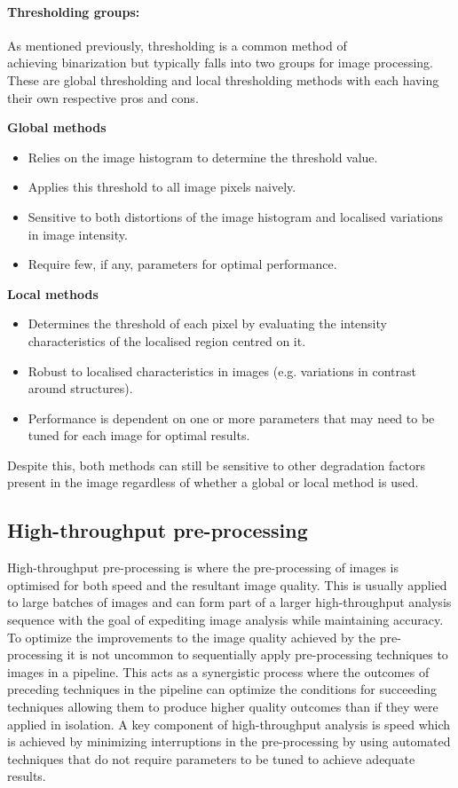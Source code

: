 \paragraph{Thresholding groups:}
As mentioned previously, thresholding is a common method of \\achieving binarization but typically falls into two groups for image processing. These are global thresholding and local thresholding methods with each having their own respective pros and cons.
\begin{multicols}{2}
\textbf{Global methods}
\begin{itemize}
    \item Relies on the image histogram to determine the threshold value.
    \item Applies this threshold to all image pixels naively.
    \item Sensitive to both distortions of the image histogram and localised variations in image intensity.
    \item Require few, if any, parameters for optimal performance.
\end{itemize}
\columnbreak
\textbf{Local methods}
\begin{itemize}
    \item Determines the threshold of each pixel by evaluating the intensity characteristics of the localised region centred on it.
    \item Robust to localised characteristics in images (e.g. variations in contrast around structures).
    \item Performance is dependent on one or more parameters that may need to be tuned for each image for optimal results.
\end{itemize}
\end{multicols}
Despite this, both methods can still be sensitive to other degradation factors present in the image regardless of whether a global or local method is used.

\subsection{High-throughput pre-processing}
High-throughput pre-processing is where the pre-processing of images is optimised for both speed and the resultant image quality. This is usually applied to large batches of images and can form part of a larger high-throughput analysis sequence with the goal of expediting image analysis while maintaining accuracy. To optimize the improvements to the image quality achieved by the pre-processing it is not uncommon to sequentially apply pre-processing techniques to images in a pipeline. This acts as a synergistic process where the outcomes of preceding techniques in the pipeline can optimize the conditions for succeeding techniques allowing them to produce higher quality outcomes than if they were applied in isolation. A key component of high-throughput analysis is speed which is achieved by minimizing interruptions in the pre-processing by using automated techniques that do not require parameters to be tuned to achieve adequate results. 


